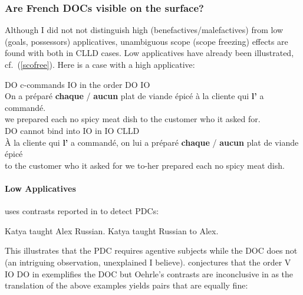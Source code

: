 \documentclass[output=paper]{langsci/langscibook}
\begin{document}
\subsubsection{Are French \glspl{DOC} visible on the surface?}

Although I did not not distinguish high (benefactives/malefactives) from low
(goals, possessors) applicatives, unambiguous scope (scope freezing) effects
are found with both in \gls{CLLD} cases. Low
applicatives have already been illustrated, cf.\ (\ref{scofree}). Here is a
case with a high applicative:

\ea\label{doio6}
    \ea DO c-commands IO in the order DO IO\\
    \gll {}On a pr\'{e}par\'{e} \textbf{chaque} / \textbf{aucun} {plat de viande \'epic\'e} \`{a} la cliente qui {\bf l'} a command\'e.\\
     we {} prepared each {} no {spicy meat dish}  to the customer who it {} {asked for}.\\
    \ex DO cannot bind into IO in IO CLLD\\
    \gll \llap{*}À la cliente qui \textbf{l'} a commandé, on lui a  préparé
        \textbf{chaque} / \textbf{aucun} {plat de viande épicé} \\
         to the customer who it {} {asked for} we to-her {} prepared each {} no
        {spicy meat dish}.\\
\z
\z

\paragraph*{Low Applicatives}

\cite{anagnostopoulou2005cross} uses contrasts reported in \cite{Oehrle:1976}
to detect \glspl{PDC}:

\ea
    \z
\z

\ea \ea Katya taught Alex Russian.
\ex Katya taught Russian to Alex.
\z
\z

\ea
{}
\z
\z

This illustrates that the \gls{PDC}
requires agentive subjects while the \gls{DOC} does not (an intriguing
observation, unexplained  I believe).  \cite{anagnostopoulou2005cross}
conjectures that the order V IO DO in  exemplifies the
\gls{DOC} but Oehrle's contrasts are
inconclusive in  as the translation of the above examples yields pairs
that are equally fine:
\end{document}
